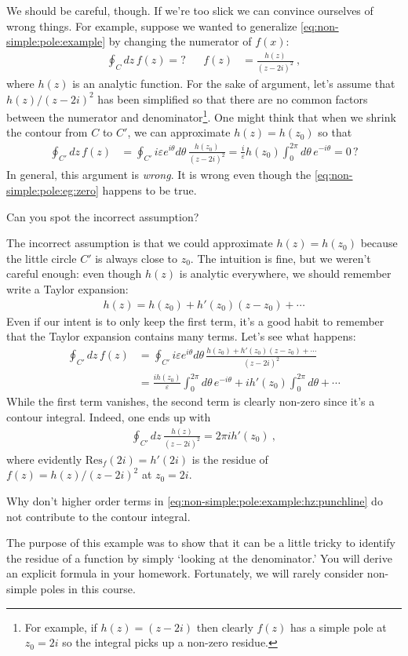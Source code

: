 We should be careful, though. If we're too slick we can convince ourselves of wrong things. For example, suppose we wanted to generalize \eqref{eq:non-simple:pole:example} by changing the numerator of $f(x)$:
\begin{align}
	\oint_C dz \, f(z) = ?
	&&
	f(z) &= \frac{h(z)}{(z-2i)^2} \ ,
	\label{eq:non-simple:pole:example:hz}
\end{align}
where $h(z)$ is an analytic function. For the sake of argument, let's assume that $h(z)/(z-2i)^2$ has been simplified so that there are no common factors between the numerator and denominator\footnote{For example, if $h(z)=(z-2i)$ then clearly $f(z)$ has a simple pole at $z_0=2i$ so the integral picks up a non-zero residue.}. One might think that when we shrink the contour from $C$ to $C'$, we can approximate $h(z)= h(z_0)$ so that
\begin{align}
	\oint_{C'}dz\, f(z)
	&=
	\oint_{C'} i\varepsilon e^{i\theta}d\theta\, 
	\frac{h(z_0)}{\left(z-2i\right)^2}
	=
	\frac{i}{\varepsilon}h(z_0)
	\int_0^{2\pi} d\theta\, 
	e^{-i\theta}
	= 0\,?
\end{align}
In general, this argument is \emph{wrong}. It is wrong even though the \eqref{eq:non-simple:pole:eg:zero} happens to be true. 
\begin{exercise}
Can you spot the incorrect assumption?
\end{exercise}
The incorrect assumption is that we could approximate $h(z) = h(z_0)$ because the little circle $C'$ is always close to $z_0$. The intuition is fine, but we weren't careful enough: even though $h(z)$ is analytic everywhere, we should remember write a Taylor expansion:
\begin{align}
	h(z) = h(z_0) + h'(z_0)(z-z_0) + \cdots
\end{align}
Even if our intent is to only keep the first term, it's a good habit to remember that the Taylor expansion contains many terms. Let's see what happens: 
\begin{align}
	\oint_{C'}dz\, f(z)
	&=
	\oint_{C'} i\varepsilon e^{i\theta}d\theta\, 
	\frac{h(z_0)+ h'(z_0)(z-z_0) + \cdots}{\left(z-2i\right)^2}
	\\
	&
	=
	\frac{ih(z_0)}{\varepsilon}
	\int_0^{2\pi} d\theta\, 
	e^{-i\theta}
	+
	{ih'(z_0)}
	\int_0^{2\pi} d\theta
	+\cdots
	\label{eq:non-simple:pole:example:hz:punchline}
\end{align}
While the first term vanishes, the second term is clearly non-zero since it's a contour integral. Indeed, one ends up with
\begin{align}
	\oint_{C'}dz\, \frac{h(z)}{(z-2i)^2}
	= 2\pi i h'(z_0) \ ,
\end{align}
where evidently $\text{Res}_f(2i)=h'(2i)$ is the residue of $f(z)=h(z)/(z-2i)^2$ at $z_0=2i$. 
\begin{exercise}
Why don't higher order terms in \eqref{eq:non-simple:pole:example:hz:punchline} do not contribute to the contour integral.
\end{exercise}
The purpose of this example was to show that it can be a little tricky to identify the residue of a function by simply `looking at the denominator.' You will derive an explicit formula in your homework. Fortunately, we will rarely consider non-simple poles in this course. 

